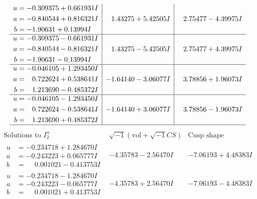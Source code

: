 \documentclass[1p]{elsarticle_modified}
\theoremstyle{definition}
\newcommand{\I}{\sqrt{-1}}
\begin{document}
$$\begin{array}{c|c|c}
\begin{aligned}
u &= -0.309375 + 0.661931 I \\
a &= -0.840544 + 0.816321 I \\
b &= -1.90631 + 0.13994 I\end{aligned}
 & \phantom{-}1.43275 + 5.42505 I & \phantom{-}2.75477 - 4.39975 I \\ \hline\begin{aligned}
u &= -0.309375 - 0.661931 I \\
a &= -0.840544 - 0.816321 I \\
b &= -1.90631 - 0.13994 I\end{aligned}
 & \phantom{-}1.43275 - 5.42505 I & \phantom{-}2.75477 + 4.39975 I \\ \hline\begin{aligned}
u &= -0.046105 + 1.293450 I \\
a &= \phantom{-}0.722624 + 0.538641 I \\
b &= \phantom{-}1.213690 - 0.485372 I\end{aligned}
 & -1.64140 - 3.06077 I & \phantom{-}3.78856 + 1.96073 I \\ \hline\begin{aligned}
u &= -0.046105 - 1.293450 I \\
a &= \phantom{-}0.722624 - 0.538641 I \\
b &= \phantom{-}1.213690 + 0.485372 I\end{aligned}
 & -1.64140 + 3.06077 I & \phantom{-}3.78856 - 1.96073 I\\
 \hline 
 \end{array}$$\newpage$$\begin{array}{c|c|c}  
\text{Solutions to }I^u_{2}& \I (\text{vol} + \sqrt{-1}CS) & \text{Cusp shape}\\
 \hline 
\begin{aligned}
u &= -0.234718 + 1.284670 I \\
a &= -0.243223 + 0.065777 I \\
b &= \phantom{-}0.001021 - 0.413753 I\end{aligned}
 & -4.35783 - 2.56470 I & -7.06193 + 4.48383 I \\ \hline\begin{aligned}
u &= -0.234718 - 1.284670 I \\
a &= -0.243223 - 0.065777 I \\
b &= \phantom{-}0.001021 + 0.413753 I\end{aligned}
 & -4.35783 + 2.56470 I & -7.06193 - 4.48383 I \\ \hline\begin{aligned}

\end{aligned}
\end{array}$$
\end{document}
